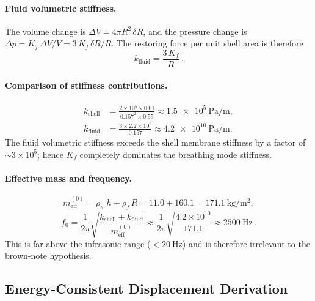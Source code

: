 \documentclass[12pt]{article}
\begin{document}
\paragraph{Fluid volumetric stiffness.}
The volume change is $\Delta V = 4\pi R^{2}\,\delta R$, and the pressure
change is $\Delta p = K_{f}\,\Delta V / V = 3\,K_{f}\,\delta R / R$.  The
restoring force per unit shell area is therefore
\begin{equation}
  k_{\mathrm{fluid}} = \frac{3\,K_{f}}{R} \,.
  \tag{S10}
  \label{eq:k_fluid_breathing}
\end{equation}

\paragraph{Comparison of stiffness contributions.}
\begin{align*}
  k_{\mathrm{shell}} &= \frac{2 \times 10^{5} \times 0.01}{0.157^{2}\times 0.55}
    \approx \SI{1.5e5}{\pascal\per\metre}, \\[4pt]
  k_{\mathrm{fluid}} &= \frac{3 \times 2.2\times10^{9}}{0.157}
    \approx \SI{4.2e10}{\pascal\per\metre}.
\end{align*}
The fluid volumetric stiffness exceeds the shell membrane stiffness by a factor
of $\sim\!3\times10^{5}$; hence $K_{f}$ completely dominates the breathing
mode stiffness.

\paragraph{Effective mass and frequency.}
\begin{equation}
  m_{\mathrm{eff}}^{(0)} = \rho_{w}\,h + \rho_{f}\,R
    = 11.0 + 160.1 = \SI{171.1}{\kilo\gram\per\metre\squared},
  \tag{S11}
\end{equation}
\begin{equation}
  f_{0} = \frac{1}{2\pi}\sqrt{\frac{k_{\mathrm{shell}}+k_{\mathrm{fluid}}}{m_{\mathrm{eff}}^{(0)}}}
  \approx \frac{1}{2\pi}\sqrt{\frac{4.2\times10^{10}}{171.1}}
  \approx \SI{2500}{\hertz} \,.
  \tag{S12}
\end{equation}
This is far above the infrasonic range ($<\SI{20}{\hertz}$) and is therefore
irrelevant to the brown-note hypothesis.

\subsection{Energy-Consistent Displacement Derivation}
\label{sec:energy_budget}
\end{document}
